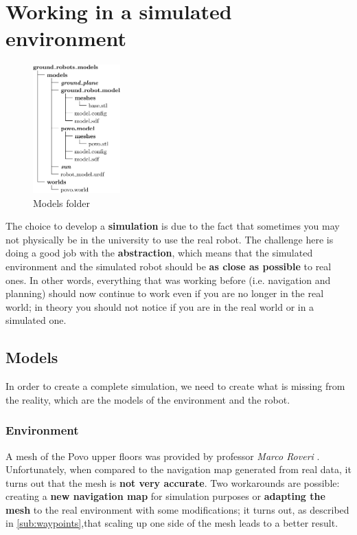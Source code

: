 \chapter{Working in a simulated environment}
\label{cha:simworld}

\noindent\begin{figure}
    \includegraphics[width=0.3\textwidth]{images/models_folder}
    \caption{Models folder}
\end{figure}
The choice to develop a \textbf{simulation} is due to the fact that sometimes you may not physically be in the university to use the real robot. The challenge here is doing a good job with the \textbf{abstraction}, which means that the simulated environment and the simulated robot should be \textbf{as close as possible} to real ones. In other words, everything that was working before (i.e. navigation and planning) should now continue to work even if you are no longer in the real world; in theory you should not notice if you are in the real world or in a simulated one.

\section{Models}

In order to create a complete simulation, we need to create what is missing from the reality, which are the models of the environment and the robot.

\subsection{Environment}
\label{sub:map}

A mesh of the Povo upper floors was provided by professor \textit{Marco Roveri} \cite{roveri}. Unfortunately, when compared to the navigation map generated from real data, it turns out that the mesh is \textbf{not very accurate}. Two workarounds are possible: creating a \textbf{new navigation map} for simulation purposes or \textbf{adapting the mesh} to the real environment with some modifications; it turns out, as described in \autoref{sub:waypoints},that scaling up one side of the mesh  leads to a better result. 

